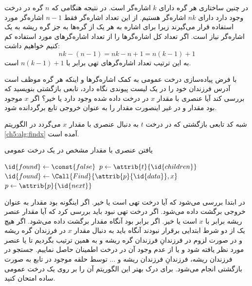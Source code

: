
در چنین ساختاری هر گره دارای {$k$} اشاره‌گر است. در نتیجه هنگامی که {$n$} گره در درخت وجود دارد دارای {$nk$} اشاره‌گر هستیم. از این تعداد اشاره‌گر فقط {$n-1$} اشاره‌گر مورد استفاده قرار می‌گیرند زیرا برای اشاره به هر یک از گره‌ها به جز گره ریشه به یک اشاره‌گر نیاز است. اگر تعداد کل اشاره‌گرها را از تعداد اشاره‌گرهای مورد استفاده کم کنیم خواهیم داشت:
\begin{displaymath}
nk-(n-1)=nk-n+1=n(k-1)+1
\end{displaymath}
به این ترتیب تعداد اشاره‌گرهای تهی برابر با {$n(k-1)+1$} است.


 با فرض پیاده‌سازی درخت عمومی به کمک اشاره‌گرها و اینکه هر گره موظف است آدرس فرزندان خود را در یک لیست پیوندی نگاه دارد، تابعی بازگشتی بنویسید که بررسی کند آیا عنصری با مقدار {$x$} در درخت داده شده وجود دارد یا خیر؟ اگر {$x$} موجود بود مقدار {} و در غیر اینصورت مقدار {} را به عنوان خروجی تابع برگردانده شود.


شبه کد تابعی بازگشتی که در درخت {$t$} به دنبال عنصری با مقدار {$x$} می‌گردد در الگوریتم {\ref{ch5:alg:findx}} آمده است.
\begin{algorithm}
\caption{یافتن عنصری با مقدار مشخص در یک درخت عمومی}\label{ch5:alg:findx}
\begin{latin}
\begin{algorithmic}[1]
				\State	\Return
		\EndIf
				\State	\Return {}
		\EndIf
		\State	$\id{found} \gets \const{false}$
		\State	$p \gets \attrib{t}{\id{children}}$
				\State	$\id{found} \gets \Call{Find}{\attrib{p}{\id{data}},x}$
				\State	$p \gets \attrib{p}{\id{next}}$
		\EndWhile
		\State	\Return {}
\EndFunction
\end{algorithmic}
\end{latin}
\end{algorithm}

در ابتدا بررسی می‌شود که آیا درخت تهی است یا خیر. اگر اینگونه بود مقدار {} به عنوان خروجی برگشت داده می‌شود. اگر درخت تهی نبود باید بررسی کرد که آیا مقدار عنصر ریشه برابر با {$x$} است یا خیر. اگر برابر بود آنگاه مقدار {} برگشت داده می‌شود. اگر هیچ یک از دو شرط ابتدایی برقرار نبودند آنگاه باید به دنبال مقدار {$x$} در فرزندان گره ریشه و در صورت لزوم در فرزندانِ فرزندان گره ریشه و به همین ترتیب بگردیم تا یا عنصر مورد نظر یافته شود و یا از عدم وجود آن در درخت اطمینان حاصل نماییم. جستجو در فرزندان ریشه، فرزندانِ فرزندان ریشه و ... توسط حلقه موجود در تابع به صورت بازگشتی انجام می‌شود. برای درک بهتر این الگوریتم آن را بر روی یک درخت عمومی ساده امتحان کنید.

